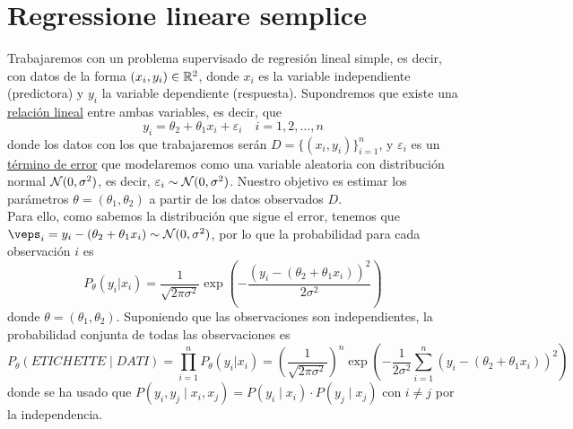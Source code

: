 \section{Regressione lineare semplice}
Trabajaremos con un problema supervisado de regresión lineal simple, es decir, con datos de la forma $(x_i, y_i) \in \mathbb{R}^2$, donde $x_i$ es la variable independiente (predictora) y $y_i$ la variable dependiente (respuesta). Supondremos que existe una \underline{relación lineal} entre ambas variables, es decir, que
\begin{equation*}
    y_i = \theta_2 + \theta_1 x_i + \varepsilon_i \quad i=1,2,\ldots,n
\end{equation*}
donde los datos con los que trabajaremos serán $D=\{(x_i,y_i)\}_{i=1}^{n}$, y $\varepsilon_i$ es un \underline{término de error} que modelaremos como una variable aleatoria con distribución normal $\mathcal{N}(0,\sigma^2)$, es decir, $\varepsilon_i \sim \mathcal{N}(0,\sigma^2)$. Nuestro objetivo es estimar los parámetros $\theta = (\theta_1, \theta_2)$ a partir de los datos observados $D$. \\

\noindent
Para ello, como sabemos la distribución que sigue el error, tenemos que \mbox{$\veps_i=y_i-(\theta_2 + \theta_1 x_i) \sim \cc{N}(0,\sigma^2)$}, por lo que la probabilidad para cada observación $i$ es
\begin{equation*}
    P_{\theta}(y_i|x_i) = \dfrac{1}{\sqrt{2\pi \sigma^2}} \exp\left( -\dfrac{(y_i - (\theta_2 + \theta_1 x_i))^2}{2\sigma^2} \right)
\end{equation*}
donde $\theta = (\theta_1, \theta_2)$. Suponiendo que las observaciones son independientes, la probabilidad conjunta de todas las observaciones es
\begin{equation*}
    P_{\theta}(ETICHETTE \mid DATI) = \prod\limits_{i=1}^{n} P_{\theta}(y_i|x_i) = \left( \dfrac{1}{\sqrt{2\pi \sigma^2}} \right)^n \exp\left( -\dfrac{1}{2\sigma^2} \sum\limits_{i=1}^{n} (y_i - (\theta_2 + \theta_1 x_i))^2 \right)
\end{equation*}
donde se ha usado que $P(y_i, y_j\mid x_i, x_j) = P(y_i\mid x_i) \cdot P(y_j\mid x_j)$ con $i\neq j$ por la independencia. \\

